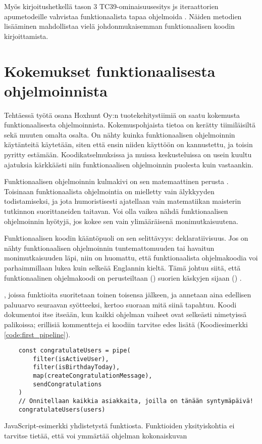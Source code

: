 Myös kirjoitushetkellä tason 3 TC39-ominaisuusesitys \gls{js} iteraattorien apumetodeille vahvistaa funktionaalista tapaa ohjelmoida \cite{tc39_iterator_helpers}. Näiden metodien lisääminen mahdollistaa vielä johdonmukaisemman funktionaalisen koodin kirjoittamista.

\section{Kokemukset funktionaalisesta ohjelmoinnista}

Tehtäessä työtä osana Hoxhunt Oy:n tuotekehitystiimiä on saatu kokemusta funktionaalisesta ohjelmoinnista. Kokemuspohjaista tietoa on kerätty tiimiläisiltä sekä muuten omalta osalta. On nähty kuinka funktionaalisen ohjelmoinnin käytänteitä käytetään, siten että ensin niiden käyttöön on kannustettu, ja toisin pyritty estämään. Koodikatselmuksissa ja muissa keskusteluissa on usein kuultu ajatuksia kärkkäästi niin funktionaalisen ohjelmoinnin puolesta kuin vastaankin.

Funktionaalisen ohjelmoinnin kulmakivi on sen matemaattinen perusta \cite{computerphile_lambda,Tan2004}. Toisinaan funktionaalista ohjelmointia on mielletty vain älykkyyden todistamiseksi, ja jota humoristisesti ajatellaan vain matematiikan maisterin tutkinnon suorittaneiden taitavan. Voi olla vaikea nähdä funktionaalisen ohjelmoinnin hyötyjä, jos kokee sen vain ylimääräisenä monimutkaisuutena.

Funktionaalisen koodin kääntöpuoli on sen selittävyys: deklaratiivisuus. Jos on nähty funktionaalisen ohjelmoinnin tuntemattomuuden tai havaitun monimutkaisuuden läpi, niin on huomattu, että funktionaalista ohjelmakoodia voi parhaimmillaan lukea kuin selkeää Englannin kieltä. Tämä johtuu siitä, että funktionaalinen ohjelmakoodi on perusteiltaan () suorien käskyjen sijaan () \cite{ms:fp_vs_imperative}.

, joissa funktioita suoritetaan toinen toisensa jälkeen, ja annetaan aina edellisen paluuarvo seuraavan syötteeksi, kertoo suoraan mitä siinä tapahtuu. Koodi dokumentoi itse itseään, kun kaikki ohjelman vaiheet ovat selkeästi nimetyissä palikoissa; erillisiä kommentteja ei koodiin tarvitse edes lisätä  (Koodiesimerkki \ref{code:first_pipeline}).

\begin{code}
    \begin{verbatim}
    const congratulateUsers = pipe(
        filter(isActiveUser),
        filter(isBirthdayToday),
        map(createCongratulationMessage),
        sendCongratulations
    )
    // Onnitellaan kaikkia asiakkaita, joilla on tänään syntymäpäivä!
    congratulateUsers(users)
\end{verbatim}
    \caption{JavaScript-esimerkki yhdistetystä funktiosta. Funktioiden yksityiskohtia ei tarvitse tietää, että voi ymmärtää ohjelman kokonaiskuvan}

    \label{code:first_pipeline}
\end{code}


